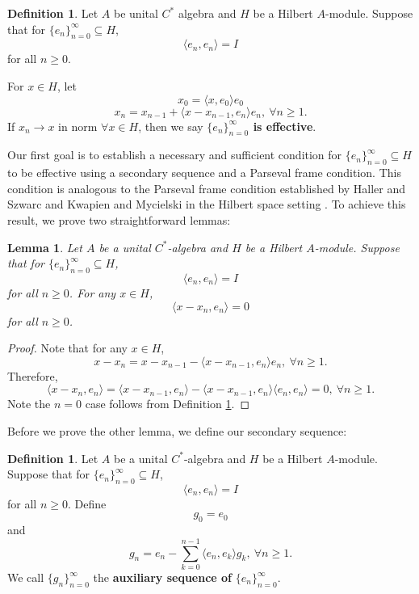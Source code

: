 \documentclass[11pt]{amsart}
\newtheorem{lem}[thm]{Lemma}
\theoremstyle{definition}
\newtheorem{defn}[thm]{Definition}
\numberwithin{equation}{section}
\begin{document}
\begin{defn}\label{kaczmarzdef}
Let $A$ be unital $C^{*}$ algebra and $H$ be a Hilbert $A$-module. Suppose that for $\{e_{n}\}_{n=0}^{\infty}\subseteq H$, $$\langle e_{n},e_{n}\rangle=I$$ for all $n\geq 0$.

For $x\in H$, let
$$x_{0}=\langle x,e_{0}\rangle e_{0} $$
$$x_{n}=x_{n-1}+\langle x-x_{n-1},e_{n}\rangle e_{n}, \ \forall n\geq 1.$$
If $x_{n}\to x$ in norm $\forall x\in H$, then we say \textbf{$\{e_{n}\}_{n=0}^{\infty}$ is effective}.   
\end{defn}

Our first goal is to establish a necessary and sufficient condition for $\{e_{n}\}_{n=0}^{\infty}\subseteq H$ to be effective using a secondary sequence and a Parseval frame condition. This condition is analogous to the Parseval frame condition established by Haller and Szwarc and Kwapien and Mycielski in the Hilbert space setting \cite{Haller2005Kaczmarz, Kwapien2001Kaczmarz}. To achieve this result, we prove two straightforward lemmas:

\begin{lem}\label{orthoglemma}
Let $A$ be a unital $C^{*}$-algebra and $H$ be a Hilbert $A$-module. Suppose that for $\{e_{n}\}_{n=0}^{\infty}\subseteq H$, $$\langle e_{n},e_{n}\rangle=I$$ for all $n\geq 0$. For any $x\in H$,
$$\langle x-x_{n},e_{n}\rangle=0$$ for all $n\geq 0$.
\end{lem}
\begin{proof}
Note that for any $x\in H$,
$$x-x_{n}=x-x_{n-1}-\langle x-x_{n-1}, e_{n}\rangle e_{n}, \ \forall n\geq 1.$$
Therefore,
$$\langle x-x_{n},e_{n}\rangle =\langle x-x_{n-1}, e_{n}\rangle -\langle x-x_{n-1},e_{n}\rangle \langle e_{n}, e_{n}\rangle =0, \ \forall n\geq 1.$$ Note the $n=0$ case follows from Definition \ref{kaczmarzdef}.
\end{proof}
Before we prove the other lemma, we define our secondary sequence:
\begin{defn}\label{auxseq}
Let $A$ be a unital $C^{*}$-algebra and $H$ be a Hilbert $A$-module. Suppose that for $\{e_{n}\}_{n=0}^{\infty}\subseteq H$, $$\langle e_{n},e_{n}\rangle=I$$ for all $n\geq 0$.
Define
$$g_{0}=e_{0}$$ and
$$g_{n}=e_{n}-\sum_{k=0}^{n-1}\langle e_{n},e_{k}\rangle g_{k}, \ \forall n\geq 1.$$
We call $\{g_{n}\}_{n=0}^{\infty}$ the \textbf{auxiliary sequence of} $\{e_{n}\}_{n=0}^{\infty}$.
\end{defn}
\end{document}
